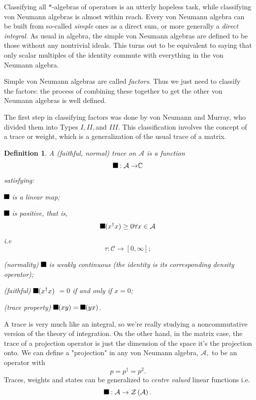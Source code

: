 \documentclass[aps,preprint]{revtex4}%
\providecommand{\U}[1]{\protect\rule{.1in}{.1in}}
\newtheorem{definition}[theorem]{Definition}
\begin{document}
Classifying all $\ast$-algebras of operators is an utterly hopeless task,
while classifying von Neumann algebras is almost within reach. Every von
Neumann algebra can be built from so-called \emph{simple} ones as a direct
sum, or more generally a \emph{direct integral}. As usual in algebra, the
simple von Neumann algebras are defined to be those without any nontrivial
ideals. This turns out to be equivalent to saying that only scalar multiples
of the identity commute with everything in the von Neumann algebra.

Simple von Neumann algebras are called \emph{factors}. Thus we just need to
classify the factors: the process of combining these together to get the other
von Neumann algebras is well defined.

The first step in classifying factors was done by von Neumann and Murray, who
divided them into Types $I,II,$and $III$. This classification involves the
concept of a trace or weight, which is a generalization of the usual trace of
a matrix.

\begin{definition}
A (faithful, normal) trace on $\mathcal{A}$ is a function%
\begin{equation}
\U{3c4} :\mathcal{A\rightarrow}\mathbb{C}%
\end{equation}
satisfying:

\textbullet\qquad$\U{3c4} $ is a linear map;

\textbullet\qquad$\U{3c4} $ is positive, that is,
\begin{equation}
\U{3c4} (x^{\dagger}x)\geq0\forall x\in\mathcal{A}%
\end{equation}
i.e
\begin{equation}
\tau:\mathcal{C}\rightarrow\left[  0,\infty\right]  ;
\end{equation}


\textbullet\qquad(normality) $\U{3c4} $ is weakly continuous (the identity is
its corresponding density operator);

\textbullet\qquad(faithful) $\U{3c4} (x^{\dagger}x)$ $=0$ if and only if $x=0$;

\textbullet\qquad(trace property) $\U{3c4} (xy)=\U{3c4} (yx)$.
\end{definition}

A trace is very much like an integral, so we're really studying a
noncommutative version of the theory of integration. On the other hand, in the
matrix case, the trace of a projection operator is just the dimension of the
space it's the projection onto. We can define a "projection" in any von
Neumann algebra, $\mathcal{A},$ to be an operator with
\begin{equation}
p=p^{\dagger}=p^{2}.
\end{equation}
Traces, weights and states can be generalized to \emph{centre valued} linear
functions i.e.
\begin{equation}
\U{3c4} :\mathcal{A\rightarrow Z}\left(  \mathcal{A}\right)  .
\end{equation}
\end{document}
